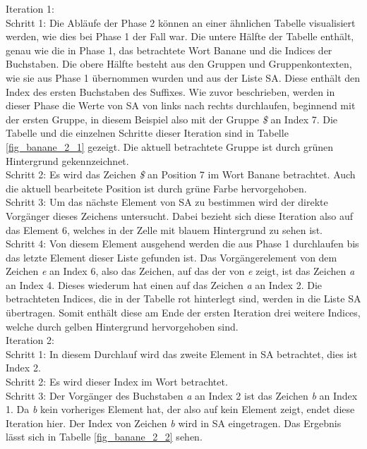 Iteration 1:\\
Schritt 1: Die Abläufe der Phase 2 können an einer ähnlichen Tabelle visualisiert werden, wie dies bei Phase 1 der Fall war.
Die untere Hälfte der Tabelle enthält, genau wie die in Phase 1, das betrachtete Wort Banane und die Indices der Buchstaben. 
Die obere Hälfte besteht aus den Gruppen und Gruppenkontexten, wie sie aus Phase 1 übernommen wurden und aus der Liste SA. 
Diese enthält den Index des ersten Buchstaben des Suffixes.
Wie zuvor beschrieben, werden in dieser Phase die Werte von SA von links nach rechts durchlaufen, beginnend mit der ersten Gruppe, in diesem Beispiel also mit der Gruppe \textit{\$} an Index 7. 
Die Tabelle und die einzelnen Schritte dieser Iteration sind in Tabelle \ref{fig_banane_2_1} gezeigt. 
Die aktuell betrachtete Gruppe ist durch grünen Hintergrund gekennzeichnet. \\
Schritt 2: Es wird das Zeichen \textit{\$} an Position 7 im Wort Banane betrachtet. 
Auch die aktuell bearbeitete Position ist durch grüne Farbe hervorgehoben. \\
Schritt 3: Um das nächste Element von SA zu bestimmen wird der direkte Vorgänger dieses Zeichens untersucht. 
Dabei bezieht sich diese Iteration also auf das Element 6, welches in der Zelle mit blauem Hintergrund zu sehen ist. \\
Schritt 4: Von diesem Element ausgehend werden die \prevpointer aus Phase 1 durchlaufen bis das letzte Element dieser Liste gefunden ist. 
Das Vorgängerelement von dem Zeichen \textit{e} an Index 6, also das Zeichen, auf das der \prevpointer von \textit{e} zeigt, ist das Zeichen \textit{a} an Index 4. 
Dieses wiederum hat einen \prevpointer auf das Zeichen \textit{a} an Index 2. 
Die betrachteten Indices, die in der Tabelle rot hinterlegt sind, werden in die Liste SA übertragen. 
Somit enthält diese am Ende der ersten Iteration drei weitere Indices, welche durch gelben Hintergrund hervorgehoben sind. \\

Iteration 2:\\
Schritt 1: In diesem Durchlauf wird das zweite Element in SA betrachtet, dies ist Index 2.\\
Schritt 2: Es wird dieser Index im Wort betrachtet.\\
Schritt 3: Der Vorgänger des Buchstaben \textit{a} an Index 2 ist das Zeichen \textit{b} an Index 1. 
Da \textit{b} kein vorheriges Element hat, der \prevpointer also auf kein Element zeigt, endet diese Iteration hier. 
Der Index von Zeichen \textit{b} wird in SA eingetragen. Das Ergebnis lässt sich in Tabelle \ref{fig_banane_2_2} sehen.\\

